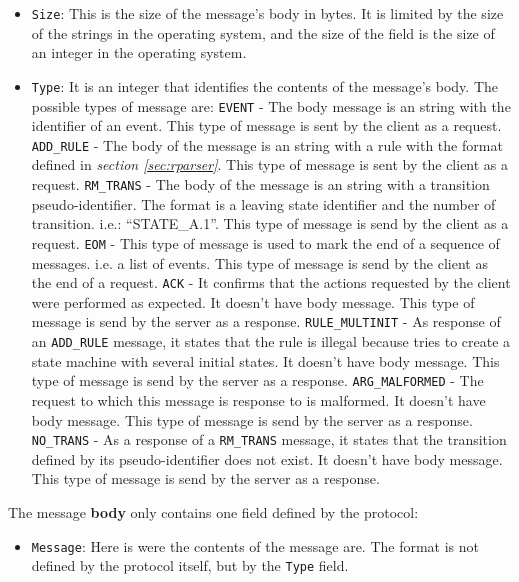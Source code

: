 \begin{itemize}
  \item \texttt{Size}: This is the size of the message's body in bytes. It is limited by the size of the strings in the operating
    system, and the size of the field is the size of an integer in the operating system.
  \item \texttt{Type}: It is an integer that identifies the contents of the message's body. The possible types of message are:
    \subitem \texttt{EVENT} - The body message is an string with the identifier of an event. This type of message is sent by the client
      as a request.
    \subitem \texttt{ADD\_RULE} - The body of the message is an string with a rule with the format defined in \emph{section 
      \ref{sec:rparser}}. This type of message is sent by the client as a request.
    \subitem \texttt{RM\_TRANS} - The body of the message is an string with a transition pseudo-identifier. The format is a leaving state 
      identifier and the number of transition. i.e.: ``STATE\_A.1''. This type of message is send by the client as a request.
    \subitem \texttt{EOM} - This type of message is used to mark the end of a sequence of messages. i.e. a list of events. 
      This type of message is send by the client as the end of a request.
    \subitem \texttt{ACK} - It confirms that the actions requested by the client were performed as expected. It doesn't have body 
      message. This type of message is send by the server as a response.
    \subitem \texttt{RULE\_MULTINIT} - As response of an \texttt{ADD\_RULE} message, it states that the rule is illegal because tries to 
      create a state machine with several initial states. It doesn't have body message. This type of message is send by the server as a 
      response.
    \subitem \texttt{ARG\_MALFORMED} - The request to which this message is response to is malformed. It doesn't have body message. 
      This type of message is send by the server as a response.
    \subitem \texttt{NO\_TRANS} - As a response of a \texttt{RM\_TRANS} message, it states that the transition defined by its 
      pseudo-identifier does not exist. It doesn't have body message. This type of message is send by the server as a response.
\end{itemize}
The message {\bf body} only contains one field defined by the protocol:
\begin{itemize}
  \item \texttt{Message}: Here is were the contents of the message are. The format is not defined by the protocol itself, but by the
    \texttt{Type} field.
\end{itemize}

